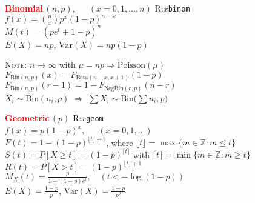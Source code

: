 \documentclass[10pt]{article}
\newenvironment{LIST}[1]{\begin{list}{}
                          { \settowidth{\labelwidth}{#1}
                            \setlength{\leftmargin}{\labelwidth}
                            \addtolength{\leftmargin}{\labelsep}
                            \setlength{\parsep}{0.5ex plus0.2ex minus0.2ex}
                            \setlength{\itemsep}{0ex plus0.2ex}
                            \renewcommand{\makelabel}[1]{##1\hfill}
                          }
                        }
                        {\end{list}}
\begin{document}
       
\setlength{\baselineskip}{15pt plus 0.3pt minus 0.2pt} %
\setcounter{section}{0}

\centerline{\textcolor{olive}{} }

\smallskip
\begin{multicols}{2}
\begin{small}
\begin{enumerate}
\item \textcolor{red}{\bfseries\textsf{Binomial}}\,$(n,p)$, ~~ $(x=0,1,\ldots,n)$ \hfill 
      \textsf{R:}$x$\texttt{\color{red}binom}  \\
      $f(x) = \binom{n}{x}p^x (1-p)^{n-x}$\\
      $M(t)=(pe^t + 1-p)^n$\\
      $E(X)=np$, $\textrm{Var}(X) =np(1-p)$
      \begin{LIST}{\textsc{Note:}}
      \item[\textsc{Note:}] 
          $n\to\infty \text{~with~} \mu=np \Rightarrow \textrm{Poisson}(\mu)$ \\
          $F_{\textrm{Bin}(n,p)}(x) = F_{\textrm{Beta}(n-x,x+1)}(1-p)$ \\
          $F_{\text{Bin}(n,p)}(r-1)=1-F_{\text{NegBin}(r,p)}(n-r)$ \\
          $X_i\sim\mathrm{Bin}(n_i,p)$ $\Rightarrow$ 
                 $\sum X_i \sim \mathrm{Bin}\big(\sum n_i,p\big)$
      \end{LIST}
\item \textcolor{red}{\bfseries\textsf{Geometric}}\,$(p)$  \hfill \textsf{R:}$x$\texttt{\color{red}geom}  \\
      $f(x)=p(1-p)^x$, ~~ $(x=0,1,\ldots)$ \\
      $F(t)=1-(1-p)^{\lfloor t\rfloor+1}$, where 
              $\lfloor t\rfloor = \max\{m\in\mathbb{Z}: m \le t\}$ \\
      $S(t)=P[X\ge t] = (1-p)^{\lceil t\rceil}$ with 
              $\lceil t\rceil = \min\{m\in\mathbb{Z}: m \ge t\}$ \\
      $R(t)=P[X  > t] = (1-p)^{\lfloor t\rfloor+1}$ \\
      $M_X(t)=\displaystyle\frac{p}{1-(1-p)e^t}, \quad ( t<-\log (1-p) )$\\
      $E(X)=\displaystyle\frac{1-p}{p}$, $\textrm{Var}(X)=\displaystyle\frac{1-p}{p^2}$ 


\end{enumerate}
\end{small}
\end{multicols}
\end{document}
